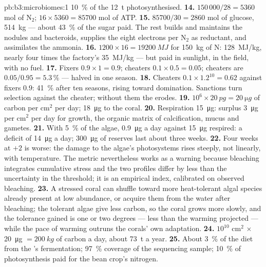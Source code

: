 \begin{solution}{pb:b3:microbiomes:1}
\qty{10}{\%} of the \qty{12}{t} photosynthesised.
\textbf{14.} $150\,000/28 = 5360$ mol of N$_{2}$; $16\times 5360 =
\num{85700}$ mol of ATP.
\textbf{15.} $\num{85700}/30 = 2860$ mol of glucose, \qty{514}{kg} ---
about \qty{43}{\%} of the sugar paid. The rest builds and maintains the
nodules and bacteroids, supplies the eight electrons per N$_{2}$ as
reductant, and assimilates the ammonia.
\textbf{16.} $1200\times 16 = \qty{19200}{MJ}$ for \qty{150}{kg} of N:
\qty{128}{MJ/kg}, nearly four times the factory's \qty{35}{MJ/kg} --- but
paid in sunlight, in the field, with no fuel.
\textbf{17.} Fixers $0.9\times 1 = 0.9$; cheaters $0.1\times 0.5 =
0.05$; cheaters are $0.05/0.95 = 5.3\,\%$ --- halved in one season.
\textbf{18.} Cheaters $0.1\times 1.2^{10} = 0.62$ against fixers $0.9$:
\qty{41}{\%} after ten seasons, rising toward domination. Sanctions turn
selection against the cheater; without them the  erodes.
\textbf{19.} $10^{6}\times \qty{20}{pg} = \qty{20}{\micro g}$ of carbon
per cm$^{2}$ per day; \qty{18}{\micro g} to the coral.
\textbf{20.} Respiration \qty{15}{\micro g}: surplus \qty{3}{\micro g}
per cm$^{2}$ per day for growth, the organic matrix of calcification,
mucus and gametes.
\textbf{21.} With \qty{5}{\%} of the algae, \qty{0.9}{\micro g} a day
against \qty{15}{\micro g} respired: a deficit of \qty{14}{\micro g} a
day; \qty{300}{\micro g} of reserves last about three weeks.
\textbf{22.} Four weeks at $+2$ is worse: the damage to the algae's
photosystems rises steeply, not linearly, with temperature. The metric
nevertheless works as a warning because bleaching integrates cumulative
stress and the two profiles differ by less than the uncertainty in the
threshold; it is an empirical index, calibrated on observed bleaching.
\textbf{23.} A stressed coral can shuffle toward more heat-tolerant algal
species already present at low abundance, or acquire them from the
water after bleaching; the tolerant algae give less carbon, so the
coral grows more slowly, and the tolerance gained is one or two
degrees --- less than the warming projected --- while the pace of
warming outruns the corals' own adaptation.
\textbf{24.} $10^{10}$ cm$^{2}$ $\times$ \qty{20}{\micro g} $=
\qty{200}{kg}$ of carbon a day, about \qty{73}{t} a year.
\textbf{25.} About \qty{3}{\%} of the diet from the 's
fermentation; \qty{97}{\%} coverage of the sequencing sample;
\qty{10}{\%} of photosynthesis paid for the bean crop's nitrogen.
\end{solution}
